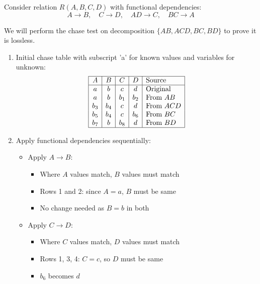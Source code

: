   \begin{example}
    Consider relation $R(A,B,C,D)$ with functional dependencies:
    \[ A \rightarrow B, \quad C \rightarrow D, \quad AD \rightarrow C, \quad BC \rightarrow A \]

    We will perform the chase test on decomposition $\{AB, ACD, BC, BD\}$ to prove it is lossless.

    \begin{enumerate}
    \item Initial chase table with subscript 'a' for known values and variables for unknown:
        \[
        \begin{array}{|c|c|c|c|l|}
        \hline
        A & B & C & D & \text{Source} \\
        \hline
        a & b & c & d & \text{Original} \\
        a & b & b_1 & b_2 & \text{From }AB \\
        b_3 & b_4 & c & d & \text{From }ACD \\
        b_5 & b_4 & c & b_6 & \text{From }BC \\
        b_7 & b & b_8 & d & \text{From }BD \\
        \hline
        \end{array}
        \]

    \item Apply functional dependencies sequentially:

        \begin{itemize}
        \item Apply $A \rightarrow B$:
            \begin{itemize}
            \item Where $A$ values match, $B$ values must match
            \item Rows 1 and 2: since $A=a$, $B$ must be same
            \item No change needed as $B=b$ in both
            \end{itemize}

        \item Apply $C \rightarrow D$:
            \begin{itemize}
            \item Where $C$ values match, $D$ values must match
            \item Rows 1, 3, 4: $C=c$, so $D$ must be same
            \item $b_6$ becomes $d$
            \end{itemize}


\end{itemize}
\end{enumerate}
\end{example}

